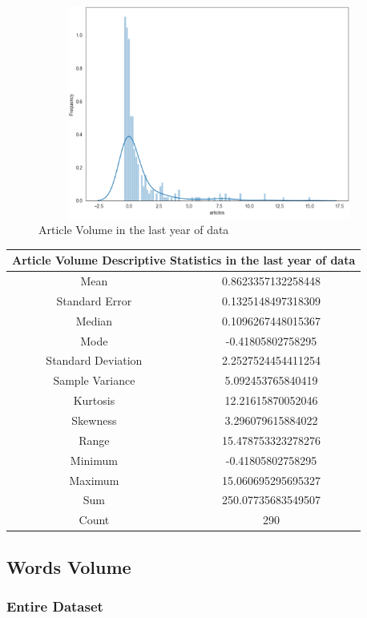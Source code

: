 \begin{figure}[h!]
    \centering
    \includegraphics[width=15cm,height=7cm,keepaspectratio]{resultsEvaluation/articleDesc1.png}
    \caption{Article Volume in the last year of data}
    \label{fig:appendix_articleDesc1}
\end{figure}
\begin{center}
\begin{tabular}{ c c }
\hline
\multicolumn{2}{|c|}{Article Volume Descriptive Statistics in the last year of data} \\
\hline
Mean & 0.8623357132258448 \\
Standard Error & 0.1325148497318309 \\
Median & 0.1096267448015367 \\
Mode & -0.41805802758295 \\
Standard Deviation & 2.2527524454411254 \\
Sample Variance & 5.092453765840419 \\
Kurtosis & 12.21615870052046 \\
Skewness & 3.296079615884022 \\
Range & 15.478753323278276 \\
Minimum & -0.41805802758295 \\
Maximum & 15.060695295695327 \\
Sum & 250.07735683549507 \\
Count & 290
\end{tabular}
\end{center}

\subsection{Words Volume}

\subsubsection{Entire Dataset}

